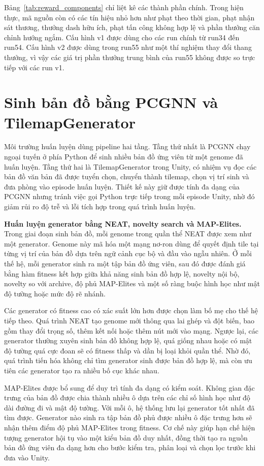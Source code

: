 Bảng~\ref{tab:reward_components} chỉ liệt kê các thành phần chính. Trong hiện thực, mã nguồn còn có các tín hiệu nhỏ hơn như phạt theo thời gian, phạt nhận sát thương, thưởng dash hữu ích, phạt tấn công không hợp lệ và phần thưởng căn chỉnh hướng ngắm. Cấu hình v1 được dùng cho các run chính từ run34 đến run54. Cấu hình v2 được dùng trong run55 như một thí nghiệm thay đổi thang thưởng, vì vậy các giá trị phần thưởng trung bình của run55 không được so trực tiếp với các run v1.

\section{Sinh bản đồ bằng PCGNN và TilemapGenerator}

Môi trường huấn luyện dùng pipeline hai tầng. Tầng thứ nhất là PCGNN chạy ngoại tuyến ở phía Python để sinh nhiều bản đồ ứng viên từ một genome đã huấn luyện. Tầng thứ hai là TilemapGenerator trong Unity, có nhiệm vụ đọc các bản đồ văn bản đã được tuyển chọn, chuyển thành tilemap, chọn vị trí sinh và đưa phòng vào episode huấn luyện. Thiết kế này giữ được tính đa dạng của PCGNN nhưng tránh việc gọi Python trực tiếp trong mỗi episode Unity, nhờ đó giảm rủi ro độ trễ và lỗi tích hợp trong quá trình huấn luyện.

\textbf{Huấn luyện generator bằng NEAT, novelty search và MAP-Elites.} Trong giai đoạn sinh bản đồ, mỗi genome trong quần thể NEAT được xem như một generator. Genome này mã hóa một mạng nơ-ron dùng để quyết định tile tại từng vị trí của bản đồ dựa trên ngữ cảnh cục bộ và đầu vào ngẫu nhiên. Ở mỗi thế hệ, mỗi generator sinh ra một tập bản đồ ứng viên, sau đó được đánh giá bằng hàm fitness kết hợp giữa khả năng sinh bản đồ hợp lệ, novelty nội bộ, novelty so với archive, độ phủ MAP-Elites và một số ràng buộc hình học như mật độ tường hoặc mức độ rẽ nhánh.

Các generator có fitness cao có xác suất lớn hơn được chọn làm bố mẹ cho thế hệ tiếp theo. Quá trình NEAT tạo genome mới thông qua lai ghép và đột biến, bao gồm thay đổi trọng số, thêm kết nối hoặc thêm nút mới vào mạng. Ngược lại, các generator thường xuyên sinh bản đồ không hợp lệ, quá giống nhau hoặc có mật độ tường quá cực đoan sẽ có fitness thấp và dần bị loại khỏi quần thể. Nhờ đó, quá trình tiến hóa không chỉ tìm generator sinh được bản đồ hợp lệ, mà còn ưu tiên các generator tạo ra nhiều bố cục khác nhau.

MAP-Elites được bổ sung để duy trì tính đa dạng có kiểm soát. Không gian đặc trưng của bản đồ được chia thành nhiều ô dựa trên các chỉ số hình học như độ dài đường đi và mật độ tường. Với mỗi ô, hệ thống lưu lại generator tốt nhất đã tìm được. Generator nào sinh ra tập bản đồ phủ được nhiều ô đặc trưng hơn sẽ nhận thêm điểm độ phủ MAP-Elites trong fitness. Cơ chế này giúp hạn chế hiện tượng generator hội tụ vào một kiểu bản đồ duy nhất, đồng thời tạo ra nguồn bản đồ ứng viên đa dạng hơn cho bước kiểm tra, phân loại và chọn lọc trước khi đưa vào Unity.


